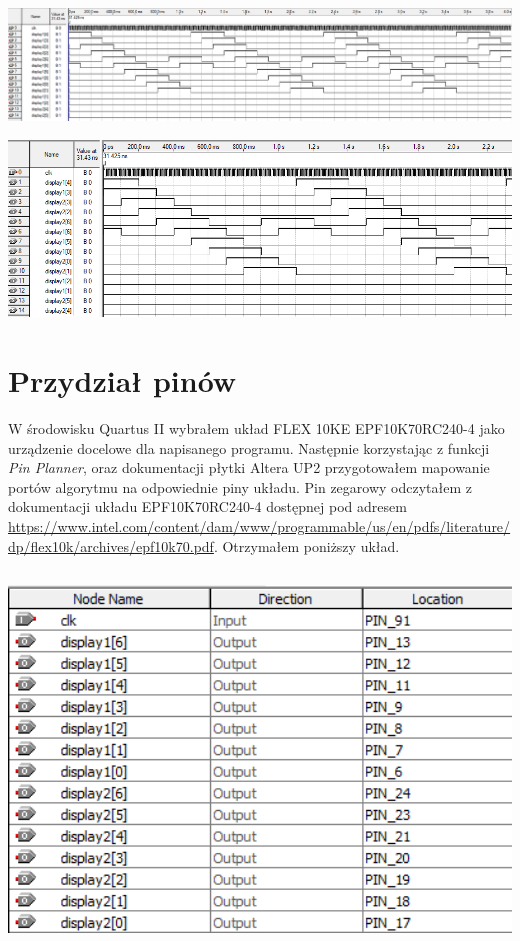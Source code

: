 \documentclass{article}
\begin{document}
        \begin{center}
            \includegraphics[width=18cm]{reports/img/fpga_sim_out.png}\\
        \end{center}
        \begin{center}
            \includegraphics[width=18cm]{reports/img/fpga_sim_out2.png}\\
        \end{center}
        
    
    \section{Przydział pinów}
        W środowisku Quartus II wybrałem układ FLEX 10KE EPF10K70RC240-4 jako urządzenie docelowe dla napisanego programu. Następnie korzystając z funkcji \textit{Pin Planner}, oraz dokumentacji płytki Altera UP2 przygotowałem mapowanie portów algorytmu na odpowiednie piny układu. Pin zegarowy odczytałem z dokumentacji układu EPF10K70RC240-4 dostępnej pod adresem \url{https://www.intel.com/content/dam/www/programmable/us/en/pdfs/literature/dp/flex10k/archives/epf10k70.pdf}. Otrzymałem poniższy układ. 
        
        \begin{center}
            \includegraphics[height=10cm]{reports/img/fpga_1.png}\\
        \end{center}
        
\end{document}
